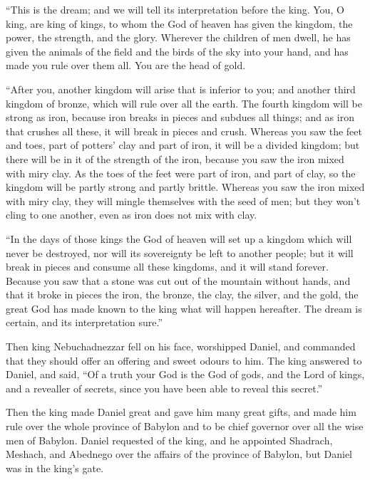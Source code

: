  ``This is the dream; and we will tell its interpretation
before the king.  You, O king, are king of kings, to whom
the God of heaven has given the kingdom, the power, the strength, and
the glory.  Wherever the children of men dwell, he has
given the animals of the field and the birds of the sky into your hand,
and has made you rule over them all. You are the head of gold.

 ``After you, another kingdom will arise that is inferior
to you; and another third kingdom of bronze, which will rule over all
the earth.  The fourth kingdom will be strong as iron,
because iron breaks in pieces and subdues all things; and as iron that
crushes all these, it will break in pieces and crush. 
Whereas you saw the feet and toes, part of potters' clay and part of
iron, it will be a divided kingdom; but there will be in it of the
strength of the iron, because you saw the iron mixed with miry clay.
 As the toes of the feet were part of iron, and part of
clay, so the kingdom will be partly strong and partly brittle.
 Whereas you saw the iron mixed with miry clay, they will
mingle themselves with the seed of men; but they won't cling to one
another, even as iron does not mix with clay.

 ``In the days of those kings the God of heaven will set up
a kingdom which will never be destroyed, nor will its sovereignty be
left to another people; but it will break in pieces and consume all
these kingdoms, and it will stand forever.  Because you saw
that a stone was cut out of the mountain without hands, and that it
broke in pieces the iron, the bronze, the clay, the silver, and the
gold, the great God has made known to the king what will happen
hereafter. The dream is certain, and its interpretation sure.''

 Then king Nebuchadnezzar fell on his face, worshipped
Daniel, and commanded that they should offer an offering and sweet
odours to him.  The king answered to Daniel, and said, ``Of
a truth your God is the God of gods, and the Lord of kings, and a
revealler of secrets, since you have been able to reveal this secret.''

 Then the king made Daniel great and gave him many great
gifts, and made him rule over the whole province of Babylon and to be
chief governor over all the wise men of Babylon.  Daniel
requested of the king, and he appointed Shadrach, Meshach, and Abednego
over the affairs of the province of Babylon, but Daniel was in the
king's gate.

